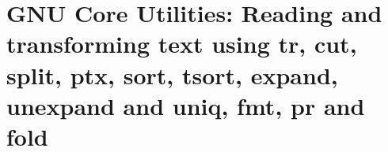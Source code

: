 
\chapter{GNU Core Utilities: Reading and transforming text using tr, cut, split, ptx, sort, tsort, expand, unexpand and uniq, fmt, pr and fold}


